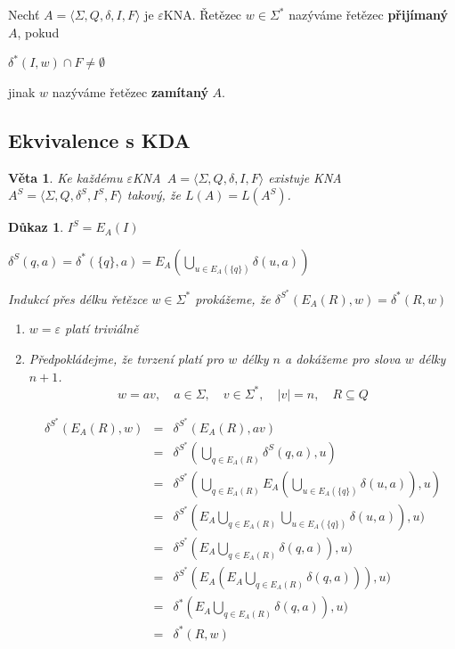 \documentclass[10pt, a4paper, titlepage]{article}
\theoremstyle{note}
\newtheorem{dukaz}{Důkaz}
\newtheorem{veta}{Věta}
\newcommand{\ekna}{$\varepsilon$KNA}		%
\begin{document}
Nechť $A=\langle\Sigma,Q,\delta,I,F\rangle$ je \ekna. Řetězec $w \in \Sigma^*$ nazýváme řetězec \textbf{přijímaný} $A$, pokud

$\delta^*(I,w) \cap F \neq \emptyset$

jinak $w$ nazýváme řetězec \textbf{zamítaný} $A$.

\subsection{Ekvivalence s KDA}

\begin{veta}
Ke každému \ekna \ $A=\langle\Sigma,Q,\delta,I,F\rangle$ existuje KNA $A^S=\langle\Sigma,Q,\delta^S,I^S,F\rangle$ takový, že $L(A)=L(A^S)$.
\end{veta}
 
 \begin{dukaz}
 $I^S=E_A(I)$
 
 $\delta^S(q,a)=\delta^*(\lbrace q \rbrace , a)= E_A(\bigcup_{u \in E_A(\lbrace q \rbrace )} \delta(u,a))$ 
 
 Indukcí přes délku řetězce $w \in \Sigma^*$ prokážeme, že $ \delta^{S^*} (E_A(R),w)=\delta^*(R,w)$
 
 \begin{enumerate}
 \item
 $w=\varepsilon$ platí triviálně
 \item
 Předpokládejme, že tvrzení platí pro $w$ délky $n$ a dokážeme pro slova $w$ délky $n+1$.
$$
w = av, \quad a \in \Sigma, \quad v \in \Sigma^*, \quad |v|=n, \quad R \subseteq Q
$$ 
 
 \begin{eqnarray*}
	\delta^{S^*} (E_A(R),w) &=& \delta^{S^*} (E_A(R),av) \\
	&=& \delta^{S^*} (\bigcup_{q \in E_A(R)} \delta^S(q,a), u) \\
	&=& \delta^{S^*} (\bigcup_{q \in E_A(R)} E_A(\bigcup_{u \in E_A(\lbrace q \rbrace)} \delta (u,a)),u) \\
	&=& \delta^{S^*} (E_{A} \bigcup_{q \in E_A(R)} \bigcup_{u \in E_A(\lbrace q \rbrace)} \delta (u,a)),u) \\
	&=& \delta^{S^*} (E_{A} \bigcup_{q \in E_A(R)} \delta (q,a)),u) \\
	&=& \delta^{S^*} (E_{A} (E_{A} \bigcup_{q \in E_A(R)} \delta (q,a))),u) \\
	&=& \delta^{*} (E_{A} \bigcup_{q \in E_A(R)} \delta (q,a)),u) \\
	&=& \delta^{*} (R, w)
 \end{eqnarray*}
 \end{enumerate} 
 \end{dukaz}
\end{document}
